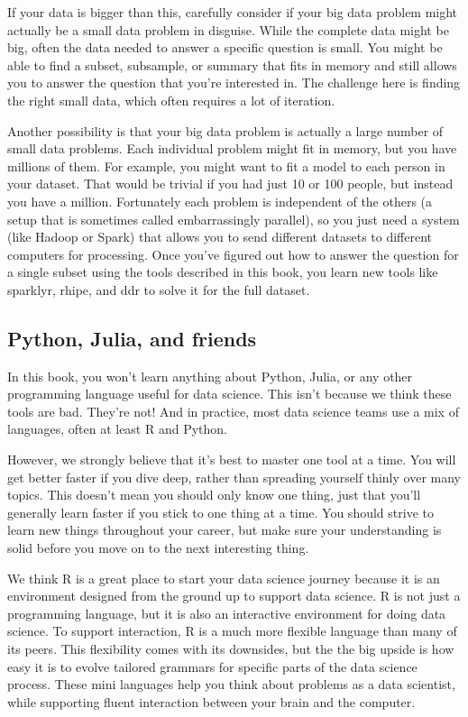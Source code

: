 \documentclass[]{book}
\begin{document}
If your data is bigger than this, carefully consider if your big data
problem might actually be a small data problem in disguise. While the
complete data might be big, often the data needed to answer a specific
question is small. You might be able to find a subset, subsample, or
summary that fits in memory and still allows you to answer the question
that you're interested in. The challenge here is finding the right small
data, which often requires a lot of iteration.

Another possibility is that your big data problem is actually a large
number of small data problems. Each individual problem might fit in
memory, but you have millions of them. For example, you might want to
fit a model to each person in your dataset. That would be trivial if you
had just 10 or 100 people, but instead you have a million. Fortunately
each problem is independent of the others (a setup that is sometimes
called embarrassingly parallel), so you just need a system (like Hadoop
or Spark) that allows you to send different datasets to different
computers for processing. Once you've figured out how to answer the
question for a single subset using the tools described in this book, you
learn new tools like sparklyr, rhipe, and ddr to solve it for the full
dataset.

\subsection{Python, Julia, and friends}\label{python-julia-and-friends}

In this book, you won't learn anything about Python, Julia, or any other
programming language useful for data science. This isn't because we
think these tools are bad. They're not! And in practice, most data
science teams use a mix of languages, often at least R and Python.

However, we strongly believe that it's best to master one tool at a
time. You will get better faster if you dive deep, rather than spreading
yourself thinly over many topics. This doesn't mean you should only know
one thing, just that you'll generally learn faster if you stick to one
thing at a time. You should strive to learn new things throughout your
career, but make sure your understanding is solid before you move on to
the next interesting thing.

We think R is a great place to start your data science journey because
it is an environment designed from the ground up to support data
science. R is not just a programming language, but it is also an
interactive environment for doing data science. To support interaction,
R is a much more flexible language than many of its peers. This
flexibility comes with its downsides, but the the big upside is how easy
it is to evolve tailored grammars for specific parts of the data science
process. These mini languages help you think about problems as a data
scientist, while supporting fluent interaction between your brain and
the computer.
\end{document}
